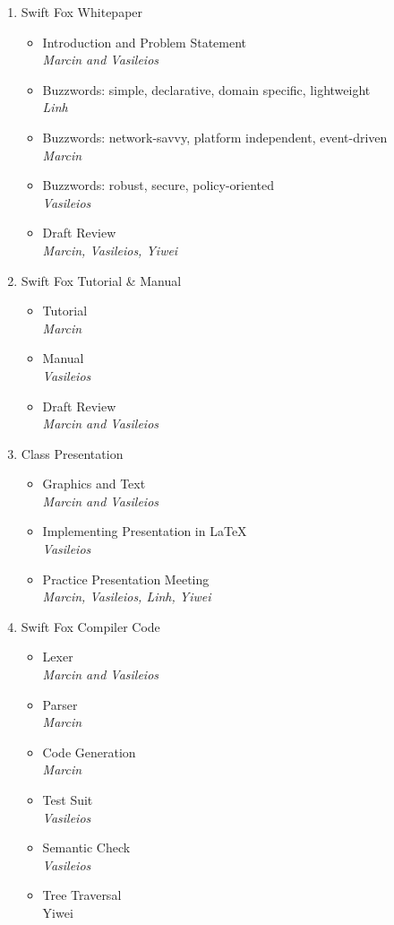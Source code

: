 \begin{enumerate}
  \item Swift Fox Whitepaper
    \begin{itemize}
      \item Introduction and Problem Statement\\\textit{Marcin and Vasileios}
      \item Buzzwords: simple, declarative, domain specific, lightweight\\\textit{Linh}
      \item Buzzwords: network-savvy, platform independent, event-driven\\\textit{Marcin}
      \item Buzzwords: robust, secure, policy-oriented\\\textit{Vasileios}
      \item Draft Review\\\textit{Marcin, Vasileios, Yiwei}
    \end{itemize}

  \item Swift Fox Tutorial \& Manual
    \begin{itemize}
      \item Tutorial\\\textit{Marcin}
      \item Manual\\\textit{Vasileios}
      \item Draft Review\\\textit{Marcin and Vasileios}
    \end{itemize}

  \item Class Presentation
    \begin{itemize}
     \item Graphics and Text\\\textit{Marcin and Vasileios}  
     \item Implementing Presentation in \LaTeX\\\textit{Vasileios}
     \item Practice Presentation Meeting\\\textit{Marcin, Vasileios, Linh, Yiwei}
    \end{itemize}

  \item Swift Fox Compiler Code
    \begin{itemize}
      \item Lexer\\\textit{Marcin and Vasileios}
      \item Parser\\\textit{Marcin}
      \item Code Generation\\\textit{Marcin}
      \item Test Suit\\\textit{Vasileios}
      \item Semantic Check\\\textit{Vasileios}
      \item Tree Traversal\\{Yiwei}
    \end{itemize}


\end{enumerate}
